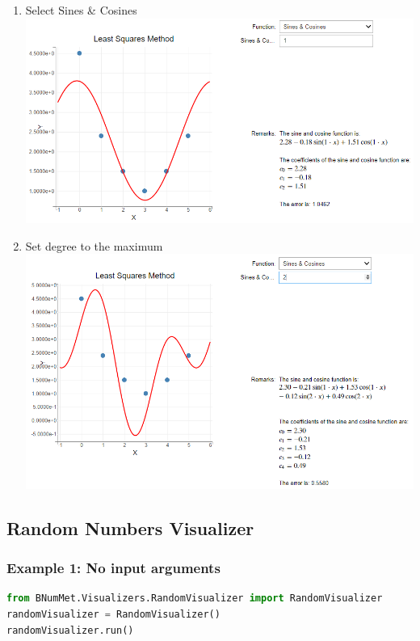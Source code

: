 {\begin{enumerate}
    \item Select Sines \& Cosines\\
    \includegraphics[scale=0.7]{Include/Images/Thesis/Documentation/Visualizers/LeastSquares/Example 3/Example 3 - 00 - Trigonometry.png}
    \item Set degree to the maximum\\
    \includegraphics[scale=0.7]{Include/Images/Thesis/Documentation/Visualizers/LeastSquares/Example 3/Example 3 - 01 - Trigonometry Degree 2.png}
\end{enumerate}
}

\subsection{Random Numbers Visualizer}
\subsubsection{Example 1: No input arguments}
\begin{lstlisting}[language=Python]
from BNumMet.Visualizers.RandomVisualizer import RandomVisualizer
randomVisualizer = RandomVisualizer()
randomVisualizer.run()
\end{lstlisting}

